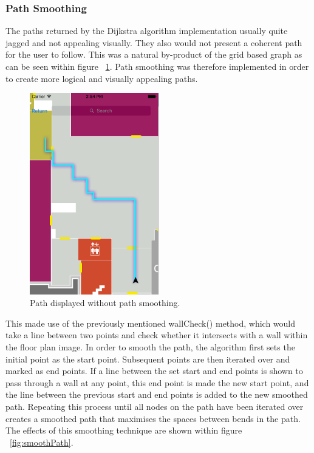 \documentclass[12pt,a4paper]{report}
\begin{document}
\subsubsection{Path Smoothing}

The paths returned by the Dijkstra algorithm implementation usually quite jagged and not appealing visually. They also would not present a coherent path for the user to follow. This was a natural by-product of the grid based graph as can be seen within figure ~\ref{fig:jaggedPath}. Path smoothing was therefore implemented in order to create more logical and visually appealing paths.

\begin{figure}[]
\center
\includegraphics[width=0.5\textwidth]{images/jaggedPath.png}
\caption{Path displayed without path smoothing.}
\label{fig:jaggedPath}
\end{figure}


This made use of the previously mentioned wallCheck() method, which would take a line between two points and check whether it intersects with a wall within the floor plan image. In order to smooth the path, the algorithm first sets the initial point as the start point. Subsequent points are then iterated over and marked as end points. If a line between the set start and end points is shown to pass through a wall at any point, this end point is made the new start point, and the line between the previous start and end points is added to the new smoothed path. Repeating this process until all nodes on the path have been iterated over creates a smoothed path that maximises the spaces between bends in the path. The effects of this smoothing technique are shown within figure ~\ref{fig:smoothPath}.
\end{document}
